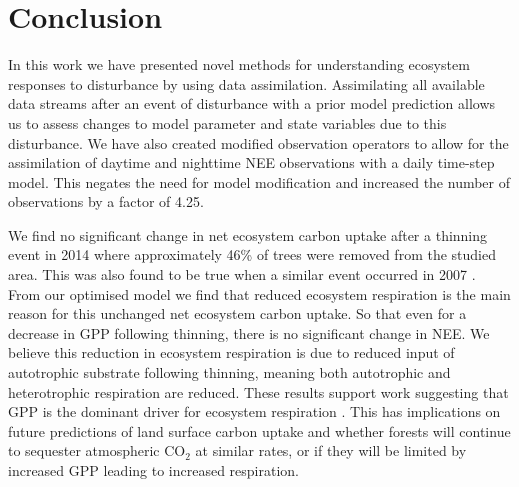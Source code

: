 \documentclass[draft,linenumbers]{agujournal}
\begin{document}

\section{Conclusion}

In this work we have presented novel methods for understanding ecosystem responses to disturbance by using data assimilation. Assimilating all available data streams after an event of disturbance with a prior model prediction allows us to assess changes to model parameter and state variables due to this disturbance. We have also created modified observation operators to allow for the assimilation of daytime and nighttime NEE observations with a daily time-step model. This negates the need for model modification and increased the number of observations by a factor of 4.25.

We find no significant change in net ecosystem carbon uptake after a thinning event in 2014 where approximately 46\% of trees were removed from the studied area. This was also found to be true when a similar event occurred in 2007 \citep{wilkinson2015effects}. From our optimised model we find that reduced ecosystem respiration is the main reason for this unchanged net ecosystem carbon uptake. So that even for a decrease in GPP following thinning, there is no significant change in NEE. We believe this reduction in ecosystem respiration is due to reduced input of autotrophic substrate following thinning, meaning both autotrophic and heterotrophic respiration are reduced. These results support work suggesting that GPP is the dominant driver for ecosystem respiration  \citep{GCB:GCB412, heinemeyer2012exploring, PCE:PCE1053, hogberg2006towards, ELE:ELE12097}. This has implications on future predictions of land surface carbon uptake and whether forests will continue to sequester atmospheric CO\(_{2}\) at similar rates, or if they will be limited by increased GPP leading to increased respiration. 





\end{document}
